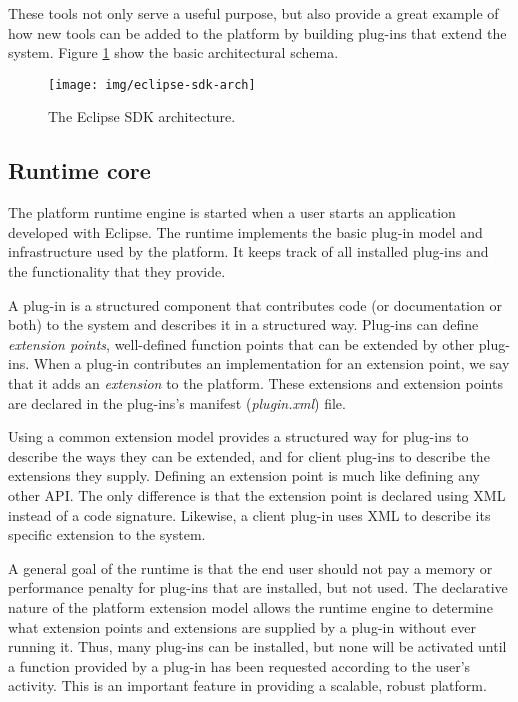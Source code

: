 These tools not only serve a useful purpose, but also provide a great example of how new tools can be added to the platform by building plug-ins that extend the system. Figure \ref{img:eclipse-sdk} show the basic architectural schema.

\begin{figure}
\centering
\texttt{[image: img/eclipse-sdk-arch]}
\caption[The Eclipse SDK architecture]{The Eclipse SDK architecture.}
\label{img:eclipse-sdk}
\end{figure}

\subsection{Runtime core}
The platform runtime engine is started when a user starts an application developed with Eclipse. The runtime implements the basic plug-in model and infrastructure used by the platform. It keeps track of all installed plug-ins and the functionality that they provide.

A plug-in is a structured component that contributes code (or documentation or both) to the system and describes it in a structured way. Plug-ins can define \emph{extension points}, well-defined function points that can be extended by other plug-ins. When a plug-in contributes an implementation for an extension point, we say that it adds an \emph{extension} to the platform. These extensions and extension points are declared in the plug-ins's manifest (\emph{plugin.xml}) file.

Using a common extension model provides a structured way for plug-ins to describe the ways they can be extended, and for client plug-ins to describe the extensions they supply. Defining an extension point is much like defining any other API. The only difference is that the extension point is declared using XML instead of a code signature. Likewise, a client plug-in uses XML to describe its specific extension to the system.

A general goal of the runtime is that the end user should not pay a memory or performance penalty for plug-ins that are installed, but not used. The declarative nature of the platform extension model allows the runtime engine to determine what extension points and extensions are supplied by a plug-in without ever running it. Thus, many plug-ins can be installed, but none will be activated until a function provided by a plug-in has been requested according to the user's activity. This is an important feature in providing a scalable, robust platform. 

